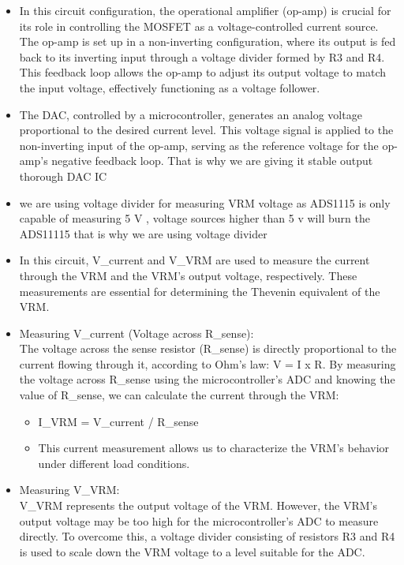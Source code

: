 \documentclass[a4paper,11pt]{article}%
\begin{document}
\begin{itemize}

  \item In this circuit configuration, the operational amplifier (op-amp) is crucial for its role in controlling the MOSFET as a voltage-controlled current source. The op-amp is set up in a non-inverting configuration, where its output is fed back to its inverting input through a voltage divider formed by R3 and R4. This feedback loop allows the op-amp to adjust its output voltage to match the input voltage, effectively functioning as a voltage follower.
  \item The DAC, controlled by a microcontroller, generates an analog voltage proportional to the desired current level. This voltage signal is applied to the non-inverting input of the op-amp, serving as the reference voltage for the op-amp's negative feedback loop. That is why we are giving it stable output thorough DAC IC
  \item we are using voltage divider for measuring VRM voltage as ADS1115 is only capable of measuring 5 V , voltage sources higher than 5 v will burn the ADS11115 that is why we are using voltage divider
  \item In this circuit, V\_current and V\_VRM are used to measure the current through the VRM and the VRM's output voltage, respectively. These measurements are essential for determining the Thevenin equivalent of the VRM.
  \item Measuring V\_current (Voltage across R\_sense):\\
  The voltage across the sense resistor (R\_sense) is directly proportional to the current flowing through it, according to Ohm's law: V = I x R. By measuring the voltage across R\_sense using the microcontroller's ADC and knowing the value of R\_sense, we can calculate the current through the VRM:
  \begin{itemize}
    \item I\_VRM = V\_current / R\_sense
    \item This current measurement allows us to characterize the VRM's behavior under different load conditions.
  \end{itemize}
  \item Measuring V\_VRM:\\
  V\_VRM represents the output voltage of the VRM. However, the VRM's output voltage may be too high for the microcontroller's ADC to measure directly. To overcome this, a voltage divider consisting of resistors R3 and R4 is used to scale down the VRM voltage to a level suitable for the ADC.

\end{itemize}
\end{document}
